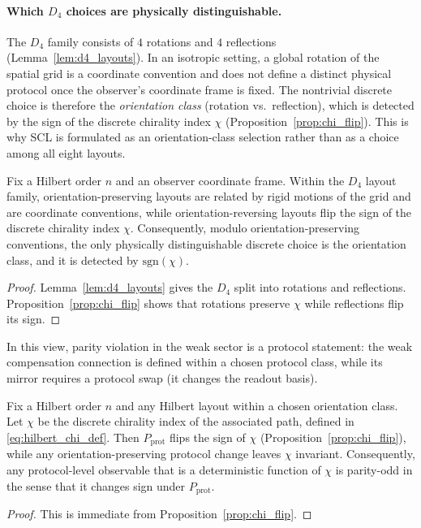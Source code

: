 \paragraph{Which $D_4$ choices are physically distinguishable.}
The $D_4$ family consists of $4$ rotations and $4$ reflections (Lemma~\ref{lem:d4_layouts}).
In an isotropic setting, a global rotation of the spatial grid is a coordinate convention and does not define a distinct physical protocol once the observer's coordinate frame is fixed.
The nontrivial discrete choice is therefore the \emph{orientation class} (rotation vs.\ reflection), which is detected by the sign of the discrete chirality index $\chi$ (Proposition~\ref{prop:chi_flip}).
This is why SCL is formulated as an orientation-class selection rather than as a choice among all eight layouts.

\begin{proposition}\label{prop:orientation_class_minimal}
Fix a Hilbert order $n$ and an observer coordinate frame.
Within the $D_4$ layout family, orientation-preserving layouts are related by rigid motions of the grid and are coordinate conventions, while orientation-reversing layouts flip the sign of the discrete chirality index $\chi$.
Consequently, modulo orientation-preserving conventions, the only physically distinguishable discrete choice is the orientation class, and it is detected by $\mathrm{sgn}(\chi)$.
\end{proposition}
\begin{proof}
Lemma~\ref{lem:d4_layouts} gives the $D_4$ split into rotations and reflections.
Proposition~\ref{prop:chi_flip} shows that rotations preserve $\chi$ while reflections flip its sign.
\end{proof}

In this view, parity violation in the weak sector is a protocol statement: the weak compensation connection is defined within a chosen protocol class, while its mirror requires a protocol swap (it changes the readout basis).
\begin{proposition}\label{prop:parity_sign_datum}
Fix a Hilbert order $n$ and any Hilbert layout within a chosen orientation class.
Let $\chi$ be the discrete chirality index of the associated path, defined in \eqref{eq:hilbert_chi_def}.
Then $P_{\mathrm{prot}}$ flips the sign of $\chi$ (Proposition~\ref{prop:chi_flip}), while any orientation-preserving protocol change leaves $\chi$ invariant.
Consequently, any protocol-level observable that is a deterministic function of $\chi$ is parity-odd in the sense that it changes sign under $P_{\mathrm{prot}}$.
\end{proposition}
\begin{proof}
This is immediate from Proposition~\ref{prop:chi_flip}.
\end{proof}
